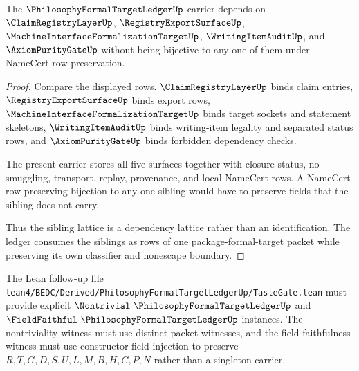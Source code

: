 \begin{theorem}
\label{thm:philosophy-formal-target-ledger-sibling-dependency}
The $\PhilosophyFormalTargetLedgerUp$ carrier depends on $\ClaimRegistryLayerUp$, $\RegistryExportSurfaceUp$, $\MachineInterfaceFormalizationTargetUp$, $\WritingItemAuditUp$, and $\AxiomPurityGateUp$ without being bijective to any one of them under NameCert-row preservation.
\end{theorem}
\begin{proof}
Compare the displayed rows. $\ClaimRegistryLayerUp$ binds claim entries, $\RegistryExportSurfaceUp$ binds export rows, $\MachineInterfaceFormalizationTargetUp$ binds target sockets and statement skeletons, $\WritingItemAuditUp$ binds writing-item legality and separated status rows, and $\AxiomPurityGateUp$ binds forbidden dependency checks.

The present carrier stores all five surfaces together with closure status, no-smuggling, transport, replay, provenance, and local NameCert rows. A NameCert-row-preserving bijection to any one sibling would have to preserve fields that the sibling does not carry.

Thus the sibling lattice is a dependency lattice rather than an identification. The ledger consumes the siblings as rows of one package-formal-target packet while preserving its own classifier and nonescape boundary.
\end{proof}



The Lean follow-up file \texttt{lean4/BEDC/Derived/PhilosophyFormalTargetLedgerUp/TasteGate.lean} must provide explicit $\Nontrivial\ \PhilosophyFormalTargetLedgerUp$ and $\FieldFaithful\ \PhilosophyFormalTargetLedgerUp$ instances. The nontriviality witness must use distinct packet witnesses, and the field-faithfulness witness must use constructor-field injection to preserve $R,T,G,D,S,U,L,M,B,H,C,P,N$ rather than a singleton carrier.

